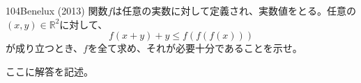 \begin{prob}{104}{}{Benelux (2013)}
 関数$f$は任意の実数に対して定義され、実数値をとる。任意の$(x,y)\in\mathbb{R}^2$に対して、
 \[ f(x+y)+y \leq f\left(f\left(f(x)\right)\right) \]
 が成り立つとき、$f$を全て求め、それが必要十分であることを示せ。
\end{prob}
ここに解答を記述。
